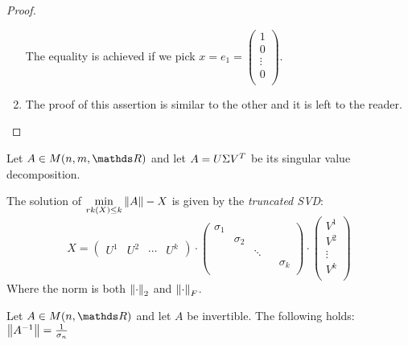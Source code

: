 \documentclass[computational_mathematics.tex]{subfiles}
\begin{document}
\begin{proof}
\begin{enumerate}
  The equality is achieved if we pick $x = e_1 = \begin{pmatrix}
    1\\
    0\\
    \vdots\\
    0\\
  \end{pmatrix}$.
    \item The proof of this assertion is similar to the other and it is left to the reader.
    \end{enumerate}
\end{proof}

\begin{theorem}
  Let $A \in M(n, m, \R)$ and let $A = U \Sigma {V}^{T}$ be its singular value decomposition.

  The solution of $\min\limits_{rk(X) \le k} \left\lVert A\right\rVert-X$ is given by the \emph{truncated SVD}:
  \[
    X = \begin{pmatrix}
      U^1 & U^2 & \cdots & U^k
    \end{pmatrix}
    \cdot
    \begin{pmatrix}
    \sigma_1\\
    & \sigma_2\\
    && \ddots\\
    &&&& \sigma_k\\
    \end{pmatrix}
    \cdot
    \begin{pmatrix}
      V^1\\
      V^2\\
      \vdots\\
      V^k\\
    \end{pmatrix}
  \]
  Where the norm is both $\left\lVert\cdot\right\rVert_2$ and $\left\lVert\cdot\right\rVert_F$.
\end{theorem}

\begin{proposition}
  Let $A \in M(n, \R)$ and let $A$ be invertible. The following holds:
$  \left\lVert{A}^{-1}\right\rVert = \frac{1}{\sigma_n}$
\end{proposition}
\end{document}
